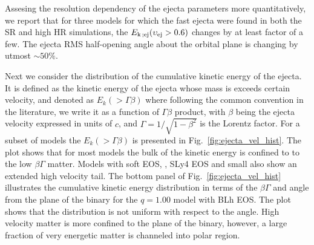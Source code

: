 Assesing the resolution dependency of the ejecta parameters more quantitatively,
we report that for three models for which the fast ejecta 
were found in both the SR and high HR simulations, 
the $E_{\rm k \,; ej}(\upsilon_{\text{ej}} > 0.6)$ changes
by at least factor of a few. The ejecta \ac{RMS} half-opening angle about the 
orbital plane is changing by utmost ${\sim}50\%$.

%
Next we consider the distribution of the cumulative kinetic energy of the ejecta. 
It is defined as the kinetic energy of the ejecta whose mass is exceeds certain velocity,
and denoted as $E_k(>\Gamma\beta)$ where following the common convention in the literature, 
we write it as a function of $\Gamma \beta$ product, with $\beta$ being the ejecta velocity 
expressed in units of $c$, and $\Gamma = 1/\sqrt{1-\beta^2}$ is the Lorentz factor.
%
For a subset of models the $E_k(>\Gamma\beta)$ is presented in Fig.~\ref{fig:ejecta_vel_hist}. 
%
The plot shows that for most models the bulk of the kinetic energy is confined to
to the low $\beta\Gamma$ matter. 
Models with soft \ac{EOS}, \eg, SLy4 \ac{EOS} and small \mr{} also show an
extended high velocity tail.
The bottom panel of Fig.~\ref{fig:ejecta_vel_hist} illustrates the 
cumulative kinetic energy distribution in terms of the $\beta \Gamma$ and angle 
from the plane of the binary for the $q=1.00$ model with BLh \ac{EOS}.
The plot shows that the distribution is not uniform with respect to the angle.
High velocity matter is more confined to the plane of the binary, however,
a large fraction of very energetic matter is channeled into polar region. 


